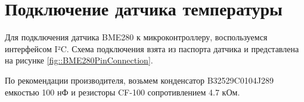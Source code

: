 \section {Подключение датчика температуры}

Для подключения датчика BME280 к микроконтроллеру, воспользуемся интерфейсом I²C. Схема подключения взята из паспорта датчика \cite{datasheet::BME280} и представлена на рисунке \ref{fig::BME280PinConnection}.


По рекомендации производителя, возьмем конденсатор B32529C0104J289 емкостью 100 нФ и резисторы CF-100 сопротивлением 4.7 кОм.

